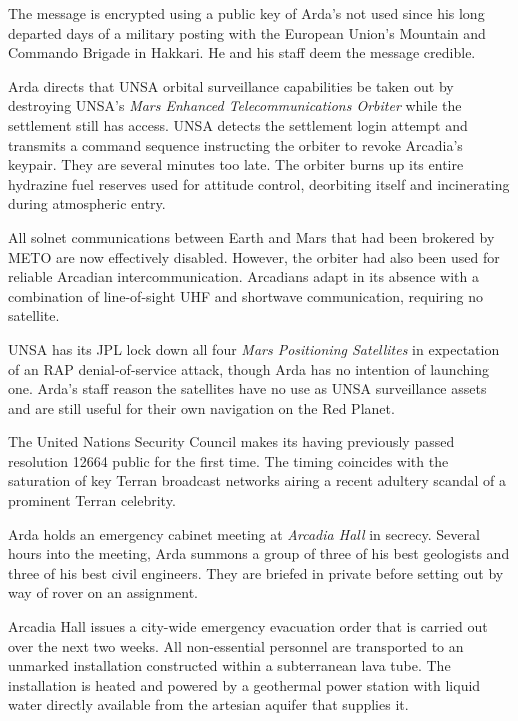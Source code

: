 The message is encrypted using a public key of Arda's not used since his long departed days of a military posting with the European Union's Mountain and Commando Brigade in Hakkari. He and his staff deem the message credible.
\StopTimelineDate

Arda directs that UNSA orbital surveillance capabilities be taken out by destroying UNSA's {\it Mars Enhanced Telecommunications Orbiter} while the settlement still has access. UNSA detects the settlement login attempt and transmits a command sequence instructing the orbiter to revoke Arcadia's keypair. They are several minutes too late. The orbiter burns up its entire hydrazine fuel reserves used for attitude control, deorbiting itself and incinerating during atmospheric entry.

All solnet communications between Earth and Mars that had been brokered by METO are now effectively disabled. However, the orbiter had also been used for reliable Arcadian intercommunication. Arcadians adapt in its absence with a combination of line-of-sight UHF and shortwave communication, requiring no satellite.

UNSA has its JPL lock down all four {\it Mars Positioning Satellites} in expectation of an RAP denial-of-service attack, though Arda has no intention of launching one. Arda's staff reason the satellites have no use as UNSA surveillance assets and are still useful for their own navigation on the Red Planet.
\StopTimelineDate

The United Nations Security Council makes its having previously passed resolution 12664 public for the first time. The timing coincides with the saturation of key Terran broadcast networks airing a recent adultery scandal of a prominent Terran celebrity.
\StopTimelineDate

Arda holds an emergency cabinet meeting at {\it Arcadia Hall} in secrecy. Several hours into the meeting, Arda summons a group of three of his best geologists and three of his best civil engineers. They are briefed in private before setting out by way of rover on an assignment.
\StopTimelineDate

Arcadia Hall issues a city-wide emergency evacuation order that is carried out over the next two weeks. All non-essential personnel are transported to an unmarked installation constructed within a subterranean lava tube. The installation is heated and powered by a geothermal power station with liquid water directly available from the artesian aquifer that supplies it.
\StopTimelineDate

